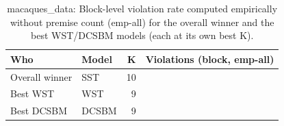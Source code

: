 \begin{table}[!h]
\centering
\caption{macaques_data: Block-level violation rate computed empirically without premise count (emp-all) for the overall winner and the best WST/DCSBM models (each at its own best K).\\\label{tab:app-macaques_data-best-block-empall}}
\centering
\begin{tabular}[t]{llrr}
\toprule
Who & Model & K & Violations (block, emp-all)\\
\midrule
Overall winner & SST & 10 & \\
Best WST & WST & 9 & \\
Best DCSBM & DCSBM & 9 & \\
\bottomrule
\end{tabular}
\end{table}
